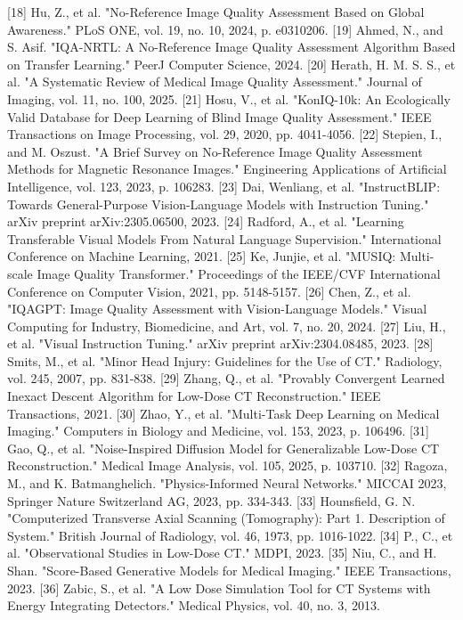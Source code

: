 [18] Hu, Z., et al. "No-Reference Image Quality Assessment Based on Global Awareness." PLoS ONE, vol. 19, no. 10, 2024, p. e0310206.
[19] Ahmed, N., and S. Asif. "IQA-NRTL: A No-Reference Image Quality Assessment Algorithm Based on Transfer Learning." PeerJ Computer Science, 2024.
[20] Herath, H. M. S. S., et al. "A Systematic Review of Medical Image Quality Assessment." Journal of Imaging, vol. 11, no. 100, 2025.
[21] Hosu, V., et al. "KonIQ-10k: An Ecologically Valid Database for Deep Learning of Blind Image Quality Assessment." IEEE Transactions on Image Processing, vol. 29, 2020, pp. 4041-4056.
[22] Stepien, I., and M. Oszust. "A Brief Survey on No-Reference Image Quality Assessment Methods for Magnetic Resonance Images." Engineering Applications of Artificial Intelligence, vol. 123, 2023, p. 106283.
[23] Dai, Wenliang, et al. "InstructBLIP: Towards General-Purpose Vision-Language Models with Instruction Tuning." arXiv preprint arXiv:2305.06500, 2023.
[24] Radford, A., et al. "Learning Transferable Visual Models From Natural Language Supervision." International Conference on Machine Learning, 2021.
[25] Ke, Junjie, et al. "MUSIQ: Multi-scale Image Quality Transformer." Proceedings of the IEEE/CVF International Conference on Computer Vision, 2021, pp. 5148-5157.
[26] Chen, Z., et al. "IQAGPT: Image Quality Assessment with Vision-Language Models." Visual Computing for Industry, Biomedicine, and Art, vol. 7, no. 20, 2024.
[27] Liu, H., et al. "Visual Instruction Tuning." arXiv preprint arXiv:2304.08485, 2023.
[28] Smits, M., et al. "Minor Head Injury: Guidelines for the Use of CT." Radiology, vol. 245, 2007, pp. 831-838.
[29] Zhang, Q., et al. "Provably Convergent Learned Inexact Descent Algorithm for Low-Dose CT Reconstruction." IEEE Transactions, 2021.
[30] Zhao, Y., et al. "Multi-Task Deep Learning on Medical Imaging." Computers in Biology and Medicine, vol. 153, 2023, p. 106496.
[31] Gao, Q., et al. "Noise-Inspired Diffusion Model for Generalizable Low-Dose CT Reconstruction." Medical Image Analysis, vol. 105, 2025, p. 103710.
[32] Ragoza, M., and K. Batmanghelich. "Physics-Informed Neural Networks." MICCAI 2023, Springer Nature Switzerland AG, 2023, pp. 334-343.
[33] Hounsfield, G. N. "Computerized Transverse Axial Scanning (Tomography): Part 1. Description of System." British Journal of Radiology, vol. 46, 1973, pp. 1016-1022.
[34] P., C., et al. "Observational Studies in Low-Dose CT." MDPI, 2023.
[35] Niu, C., and H. Shan. "Score-Based Generative Models for Medical Imaging." IEEE Transactions, 2023.
[36] Zabic, S., et al. "A Low Dose Simulation Tool for CT Systems with Energy Integrating Detectors." Medical Physics, vol. 40, no. 3, 2013.
